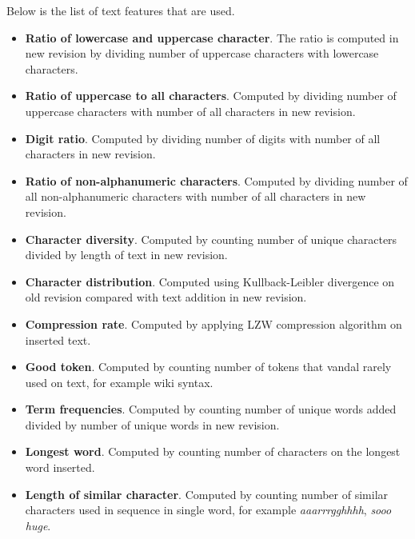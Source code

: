 Below is the list of text features that are used.

\begin{itemize}
\item \textbf{Ratio of lowercase and uppercase character}. The ratio is
computed in new revision by dividing number of uppercase characters with
lowercase characters.
\item \textbf{Ratio of uppercase to all characters}. Computed by dividing
number of uppercase characters with number of all characters in new revision.
\item \textbf{Digit ratio}. Computed by dividing number of digits with number of
all characters in new revision.
\item \textbf{Ratio of non-alphanumeric characters}. Computed by dividing
number of all non-alphanumeric characters with number of all characters in new
revision.
\item \textbf{Character diversity}. Computed by counting number of unique
characters divided by length of text in new revision.
\item \textbf{Character distribution}. Computed using Kullback-Leibler
divergence on old revision compared with text addition in new revision.
\item \textbf{Compression rate}. Computed by applying LZW compression algorithm
on inserted text.
\item \textbf{Good token}. Computed by counting number of tokens that vandal
rarely used on text, for example wiki syntax.
\item \textbf{Term frequencies}. Computed by counting number of unique words
added divided by number of unique words in new revision.
\item \textbf{Longest word}. Computed by counting number of characters on the
longest word inserted.
\item \textbf{Length of similar character}. Computed by counting number of
similar characters used in sequence in single word, for example
\textit{aaarrrgghhhh}, \textit{sooo huge}.
\end{itemize}
